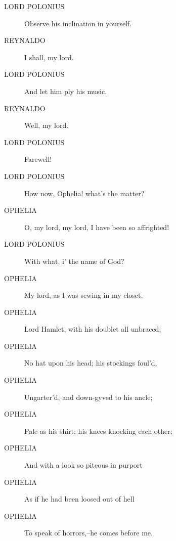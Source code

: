 \documentclass{article}
\begin{document}
\begin{description}
            
\item[LORD POLONIUS] Observe his inclination in yourself.
\end{description}
          
\begin{description}
            
\item[REYNALDO] I shall, my lord.
\end{description}
          
\begin{description}
            
\item[LORD POLONIUS] And let him ply his music.
\end{description}
          
\begin{description}
            
\item[REYNALDO] Well, my lord.
\end{description}
          
\begin{description}
            
\item[LORD POLONIUS] Farewell!
\item[LORD POLONIUS] How now, Ophelia! what's the matter?
\end{description}
          
\begin{description}
            
\item[OPHELIA] O, my lord, my lord, I have been so affrighted!
\end{description}
          
\begin{description}
            
\item[LORD POLONIUS] With what, i' the name of God?
\end{description}
          
\begin{description}
            
\item[OPHELIA] My lord, as I was sewing in my closet,
\item[OPHELIA] Lord Hamlet, with his doublet all unbraced;
\item[OPHELIA] No hat upon his head; his stockings foul'd,
\item[OPHELIA] Ungarter'd, and down-gyved to his ancle;
\item[OPHELIA] Pale as his shirt; his knees knocking each other;
\item[OPHELIA] And with a look so piteous in purport
\item[OPHELIA] As if he had been loosed out of hell
\item[OPHELIA] To speak of horrors,--he comes before me.
\end{description}
          
\end{document}
